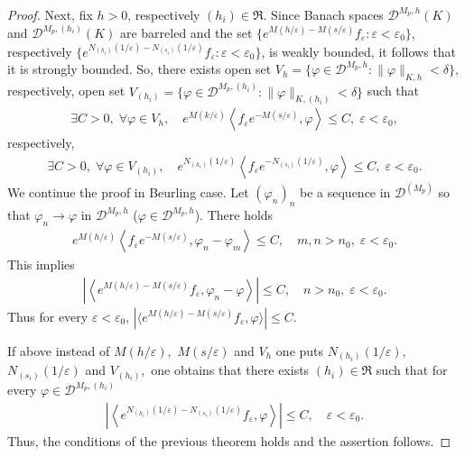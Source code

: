 \documentclass[sn-mathphys,Numbered]{sn-jnl}%
\theoremstyle{thmstyleone}%
\theoremstyle{thmstyletwo}%
\theoremstyle{thmstylethree}%
\begin{document}
\begin{proof}
Next, fix $h>0$, respectively $(h_i)\in\mathfrak R.$  Since Banach spaces $\mathcal{D}^{M_p,h}(K)$ and $\mathcal{D}^{M_p,(h_i)}(K)$ are 
barreled and the set 
$\{e^{M(h/\varepsilon)-M(s/\varepsilon)}f_\varepsilon : \varepsilon<\varepsilon_0\}$, respectively 
$\{e^{N_{(h_i)}(1/\varepsilon)-N_{(s_i)}(1/\varepsilon)}f_\varepsilon:\varepsilon<\varepsilon_0\}$, is weakly bounded, it follows that it is strongly bounded. 
So, there exists open set $V_h=\{\varphi\in\mathcal{D}^{M_p,h}: \|\varphi\|_{K,h}<\delta\},$ respectively, open set $V_{(h_i)}=\{\varphi\in\mathcal{D}^{M_p,(h_i)}: \|\varphi\|_{K,(h_i)}<\delta\}$ such that 
\begin{align*}
\exists C>0,\;\forall \varphi\in V_h,\quad e^{M(k/\varepsilon)}\left\langle f_\varepsilon e^{-M(s/\varepsilon)},\varphi\right\rangle \leq C,\;\varepsilon<\varepsilon_0,
\end{align*}
respectively,
\begin{align*}
\exists C>0,\;\forall \varphi\in V_{(h_i)},\quad e^{N_{(h_i)}(1/\varepsilon)}\left\langle f_\varepsilon e^{-N_{(s_i)}(1/\varepsilon)},\varphi\right\rangle \leq C,\;\varepsilon<\varepsilon_0.
\end{align*}
We continue the proof in Beurling case. Let $(\varphi_n)_n$ be a sequence in $\mathcal{D}^{(M_p)}$ so that $\varphi_n\to \varphi$ in $\mathcal{D}^{M_p,h}$ ($\varphi\in \mathcal{D}^{M_p,h}$). There holds
\begin{align*}
e^{M(h/\varepsilon)}\left\langle f_\varepsilon e^{-M(s/\varepsilon)},\varphi_n-\varphi_m\right\rangle\leq C,\quad m,n>n_0, \;\varepsilon<\varepsilon_0.
\end{align*}
 This implies 
\begin{align*}
\left|\left\langle e^{M(h/\varepsilon)-M(s/\varepsilon)}f_\varepsilon,\varphi_n-\varphi\right\rangle\right|\leq C,\quad n>n_0,\; \varepsilon<\varepsilon_0.
\end{align*}
Thus for every $\varepsilon<\varepsilon_0$,
$
|\langle e^{M(h/\varepsilon)-M(s/\varepsilon)}f_\varepsilon,\varphi\rangle|\leq C.
$

If above instead of $M(h/\varepsilon),$ $M(s/\varepsilon)$ and $V_h$ one puts 
$N_{(h_i)}(1/\varepsilon),$ 
$N_{(s_i)}(1/\varepsilon)$ 
and $V_{(h_i)},$ one obtains that there exists $(h_i)\in \mathfrak{R}$ such that for every $\varphi\in \mathcal{D}^{M_p,(h_i)}$
\begin{align*}
\left|\left\langle e^{N_{(h_i)}(1/\varepsilon)-N_{(s_i)}(1/\varepsilon)}f_\varepsilon,\varphi\right\rangle\right|\leq C,\quad \varepsilon<\varepsilon_0.
\end{align*}
Thus, the conditions of the previous theorem holds and the assertion follows.
\end{proof}
\end{document}

